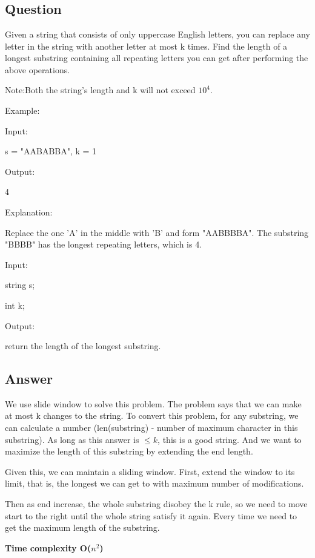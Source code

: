 \newpage
\section{}
\subsection{Question}
Given a string that consists of only uppercase English letters, you can replace any letter in the string with another letter at most k times. Find the length of a longest substring containing all repeating letters you can get after performing the above operations.
    
Note:Both the string's length and k will not exceed $10^4$.

Example:

Input:

s = "AABABBA", k = 1

Output:

4

Explanation:

Replace the one 'A' in the middle with 'B' and form "AABBBBA".
The substring "BBBB" has the longest repeating letters, which is 4.

Input:

string s;

int k;

Output:

return the length of the longest substring.

\subsection{Answer}
We use slide window to solve this problem. The problem says that we can make at most k changes to the string. To convert this problem, for any substring, we can calculate a number (len(substring) - number of maximum character in this substring).  As long as this answer is $\leq k$, this is a good string. And we want to maximize the length of this substring by extending the end length.

Given this, we can maintain a sliding window. First, extend the window to its limit, that is, the longest we can get to with maximum number of modifications. 

Then as end increase, the whole substring disobey the k rule, so we need to move start to the right until the whole string satisfy it again. Every time we need to get the maximum length of the substring.


\textbf{\color{red}Time complexity O($n^2$)}
